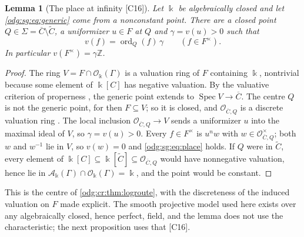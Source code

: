 \documentclass[11pt,oneside]{article}
\numberwithin{equation}{section}
\newtheorem{lemma}[lemma]{Lemma}
\theoremstyle{definition}
\theoremstyle{remark}
\newcommand{\Z}{\mathbb Z}
\newcommand{\src}[1]{\textup{\textsf{\small[#1]}}}
\newcommand{\crA}{\mathcal A_\Bbbk(\Gamma)}
\newcommand{\crO}{\mathcal O_\Bbbk(\Gamma)}
\newcommand{\Spec}{\operatorname{Spec}}
\begin{document}
\begin{lemma}[The place at infinity \src{C16}]\label{odg:sg:lem:place}
Let $\Bbbk$ be algebraically closed and let \eqref{odg:sg:eq:generic} come from a
nonconstant point. There are a closed point $Q\in\Sigma=\overline C\setminus\widetilde C$, a
uniformizer $u\in F$ at $Q$ and $\gamma=v(u)>0$ such that
\begin{equation}\label{odg:sg:eq:place}
 v(f)=\operatorname{ord}_Q(f)\,\gamma\qquad(f\in F^\times).
\end{equation}
In particular $v(F^\times)=\gamma\Z$.
\end{lemma}
\begin{proof}
The ring $V=F\cap\crO$ is a valuation ring of $F$ containing $\Bbbk$, nontrivial because
some element of $\Bbbk[C]$ has negative valuation. By the valuative criterion of
properness \cite[Tag 0BX5]{StacksProper}, the generic point extends to
$\Spec V\to\overline C$. The centre $Q$ is not the generic point, for then $F\subseteq V$;
so it is closed, and $\mathcal O_{\overline C,Q}$ is a discrete valuation ring
\cite{StacksCurves}. The local inclusion $\mathcal O_{\overline C,Q}\to V$ sends a
uniformizer $u$ into the maximal ideal of $V$, so $\gamma=v(u)>0$. Every $f\in F^\times$ is
$u^nw$ with $w\in\mathcal O_{\overline C,Q}^\times$; both $w$ and $w^{-1}$ lie in $V$, so
$v(w)=0$ and \eqref{odg:sg:eq:place} holds. If $Q$ were in $\widetilde C$, every element of
$\Bbbk[C]\subseteq\Bbbk[\widetilde C]\subseteq\mathcal O_{\overline C,Q}$ would have
nonnegative valuation, hence lie in $\crA\cap\crO=\Bbbk$, and the point would be
constant.
\end{proof}

This is the centre of \cref{odg:cr:thm:logroute}, with the discreteness of the induced
valuation on $F$ made explicit. The smooth projective model used here exists over any
algebraically closed, hence perfect, field, and the lemma does not use the
characteristic; the next proposition uses that \src{C16}.
\end{document}
